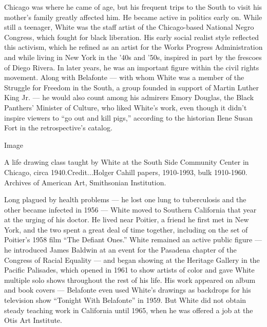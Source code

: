 Chicago was where he came of age, but his frequent trips to the South to
visit his mother's family greatly affected him. He became active in
politics early on. While still a teenager, White was the staff artist of
the Chicago-based National Negro Congress, which fought for black
liberation. His early social realist style reflected this activism,
which he refined as an artist for the Works Progress Administration and
while living in New York in the '40s and '50s, inspired in part by the
frescoes of Diego Rivera. In later years, he was an important figure
within the civil rights movement. Along with Belafonte --- with whom
White was a member of the Struggle for Freedom in the South, a group
founded in support of Martin Luther King Jr. --- he would also count
among his admirers Emory Douglas, the Black Panthers' Minister of
Culture, who liked White's work, even though it didn't inspire viewers
to ``go out and kill pigs,'' according to the historian Ilene Susan Fort
in the retrospective's catalog.

Image

A life drawing class taught by White at the South Side Community Center
in Chicago, circa 1940.Credit...Holger Cahill papers, 1910-1993, bulk
1910-1960. Archives of American Art, Smithsonian Institution.

Long plagued by health problems --- he lost one lung to tuberculosis and
the other became infected in 1956 --- White moved to Southern California
that year at the urging of his doctor. He lived near Poitier, a friend
he first met in New York, and the two spent a great deal of time
together, including on the set of Poitier's 1958 film ``The Defiant
Ones.'' White remained an active public figure --- he introduced James
Baldwin at an event for the Pasadena chapter of the Congress of Racial
Equality --- and began showing at the Heritage Gallery in the Pacific
Palisades, which opened in 1961 to show artists of color and gave White
multiple solo shows throughout the rest of his life. His work appeared
on album and book covers --- Belafonte even used White's drawings as
backdrops for his television show ``Tonight With Belafonte'' in 1959.
But White did not obtain steady teaching work in California until 1965,
when he was offered a job at the Otis Art Institute.

